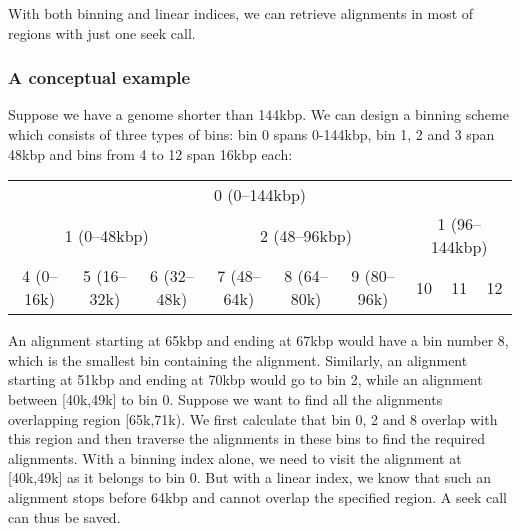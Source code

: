 \documentclass[10pt]{article}
\begin{document}
With both binning and linear indices, we can retrieve alignments in most
of regions with just one seek call.

\subsubsection{A conceptual example}
Suppose we have a genome shorter than 144kbp. We can design a binning
scheme which consists of three types of bins: bin 0 spans 0-144kbp, bin
1, 2 and 3 span 48kbp and bins from 4 to 12 span 16kbp each:

\begin{table}[ht]
  \centering
  {\small\begin{tabular}{|c|c|c|c|c|c|c|c|c|}
    \cline{1-9}
    \multicolumn{9}{|c|}{0 (0--144kbp)}\\\cline{1-9}
    \multicolumn{3}{|c|}{1 (0--48kbp)} & \multicolumn{3}{c|}{2 (48--96kbp)} & \multicolumn{3}{c|}{1 (96--144kbp)} \\\cline{1-9}
    4 (0--16k) & 5 (16--32k) & 6 (32--48k) & 7 (48--64k) & 8 (64--80k) & 9 (80--96k) & 10 & 11 & 12 \\
    \cline{1-9}
  \end{tabular}}
\end{table}

An alignment starting at 65kbp and ending at 67kbp would have a bin
number 8, which is the smallest bin containing the alignment. Similarly,
an alignment starting at 51kbp and ending at 70kbp would go to bin 2,
while an alignment between [40k,49k] to bin 0. Suppose we want to find
all the alignments overlapping region [65k,71k). We first calculate that
bin 0, 2 and 8 overlap with this region and then traverse the alignments
in these bins to find the required alignments. With a binning index
alone, we need to visit the alignment at [40k,49k] as it belongs to bin
0. But with a linear index, we know that such an alignment stops before
64kbp and cannot overlap the specified region. A seek call can thus be
saved.
\end{document}
